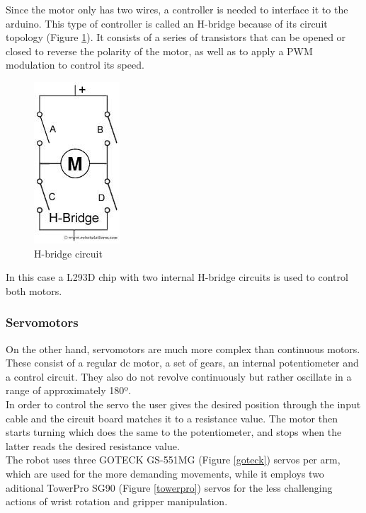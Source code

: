 	Since the motor only has two wires, a controller is needed to interface it to the arduino. This type of controller is called an H-bridge because of its circuit topology (Figure \ref{h-bridge}). It consists of a series of transistors that can be opened or closed to reverse the polarity of the motor, as well as to apply a PWM modulation to control its speed.\\

		\begin{figure}[H]
			\centering
			\includegraphics[scale=0.6]{images/ProjectComponents/h-bridge.jpg}
			\caption{H-bridge circuit }
			\label{h-bridge}
		\end{figure}
		\bigskip

	In this case a L293D chip with two internal H-bridge circuits is used to control both motors.

	\subsubsection{Servomotors}

	On the other hand, servomotors are much more complex than continuous motors. These consist of a regular dc motor, a set of gears, an internal potentiometer and a control circuit. They also do not revolve continuously but rather oscillate in a range of approximately 180º.	\\

	In order to control the servo the user gives the desired position through the input cable and the circuit board matches it to a resistance value. The motor then starts turning which does the same to the potentiometer, and stops when the latter reads the desired resistance value.\\

	The robot uses three GOTECK GS-551MG (Figure \ref{goteck}) servos per arm, which are used for the more demanding movements, while it employs two aditional TowerPro SG90 (Figure \ref{towerpro}) servos for the less challenging actions of wrist rotation and gripper manipulation.

